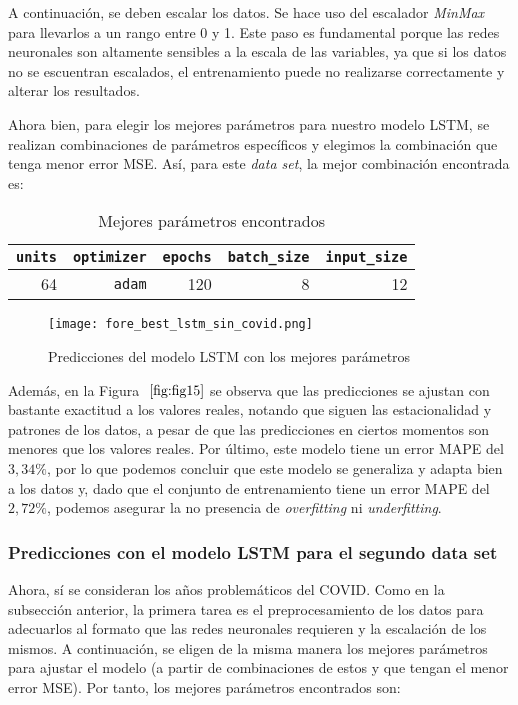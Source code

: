 \documentclass[12pt,twoside]{article}
\begin{document}
A continuación, se deben escalar los datos. Se hace uso del escalador \textit{MinMax} para llevarlos a un rango entre 0 y 1. Este paso es fundamental porque las redes neuronales son altamente sensibles a la escala de las variables, ya que si los datos no se escuentran escalados, el entrenamiento puede no realizarse correctamente y alterar los resultados.

Ahora bien, para elegir los mejores parámetros para nuestro modelo LSTM, se realizan combinaciones de parámetros específicos y elegimos la combinación que tenga menor error MSE. Así, para este \textit{data set}, la mejor combinación encontrada es: 


\begin{table}[ht] 
\centering
\begin{tabular}{rrrrr} 
  \hline
 \texttt{units} & \texttt{optimizer} & \texttt{epochs} & \texttt{batch\_size} & \texttt{input\_size} \\ 
  \hline
64 & \texttt{adam} & 120 & 8 & 12 \\ 
   \hline
\end{tabular}
\caption{Mejores parámetros encontrados} \label{tab:01}
\end{table}

\begin{figure}[h]
    \centering
    \texttt{[image: fore\_best\_lstm\_sin\_covid.png]}
    \caption{Predicciones del modelo LSTM con los mejores parámetros} 
    \label{fig:fig15}
\end{figure}

Además, en la Figura $~\ref{fig:fig15}$ se observa que las predicciones se ajustan con bastante exactitud a los valores reales, notando que siguen las estacionalidad y patrones de los datos, a pesar de que las predicciones en ciertos momentos son menores que los valores reales. Por último, este modelo tiene un error MAPE del $3,34\%$, por lo que podemos concluir que este modelo se generaliza y adapta bien a los datos y, dado que el conjunto de entrenamiento tiene un error MAPE del $2,72\%$, podemos asegurar la no presencia de \textit{overfitting} ni \textit{underfitting}.

\subsubsection{Predicciones con el modelo LSTM para el segundo data set}\label{sec:20}

Ahora, sí se consideran los años problemáticos del COVID. Como en la subsección anterior, la primera tarea es el preprocesamiento de los datos para adecuarlos al formato que las redes neuronales requieren y la escalación de los mismos. A continuación, se eligen de la misma manera los mejores parámetros para ajustar el modelo (a partir de combinaciones de estos y que tengan el menor error MSE). Por tanto, los mejores parámetros encontrados son: 
\end{document}
